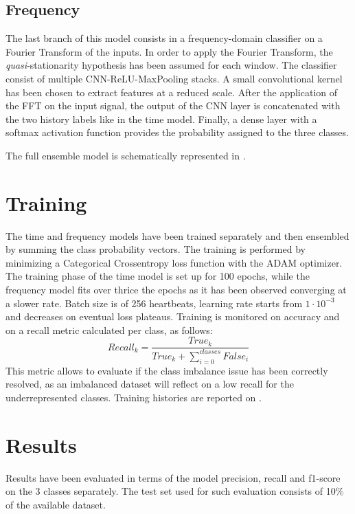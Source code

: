 \documentclass[conference]{IEEEtran}
\begin{document}
\subsection{Frequency}
    The last branch of this model consists in a frequency-domain
    classifier on a Fourier Transform of the inputs. In order to apply
    the Fourier Transform, the \textit{quasi}-stationarity hypothesis
    has been assumed for each window.
    The classifier consist of multiple CNN-ReLU-MaxPooling stacks. A
    small convolutional kernel has been chosen to extract features at
    a reduced scale. After the application of the FFT on the input
    signal, the output of the CNN layer is concatenated with the two
    history labels like in the time model. Finally, a dense layer with
    a softmax activation function provides the probability assigned to
    the three classes.  

    The full ensemble model is schematically represented in
    .

\section{Training}
    The time and frequency models have been trained separately and
    then ensembled by summing the class probability vectors. The
    training is performed by minimizing a Categorical Crossentropy
    loss function with the ADAM optimizer. The training phase of the
    time model is set up for 100 epochs, while the frequency model
    fits over thrice the epochs as it has been observed converging at
    a slower rate. Batch size is of 256 heartbeats, learning rate
    starts from $1\cdot10^{-3}$ and decreases on eventual loss
    plateaus. Training is monitored on accuracy and on a recall metric
    calculated per class, as follows:
    \begin{equation}
        Recall_k=\frac{True_k}{True_k+\sum_{i=0}^{classes}False_i}
    \end{equation}
    This metric allows to evaluate if the class imbalance issue has
    been correctly resolved, as an imbalanced dataset will reflect on
    a low recall for the underrepresented classes. Training histories
    are reported on .

\section{Results}
    Results have been evaluated in terms of the model precision,
    recall and f1-score on the 3 classes separately. The test set used
    for such evaluation consists of 10\% of the available dataset.
    
\end{document}
